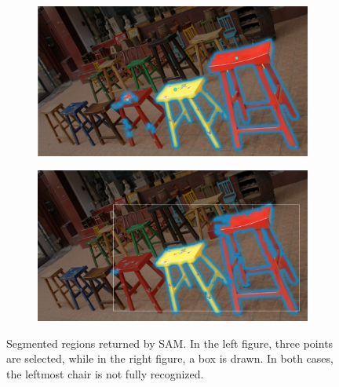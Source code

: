 \begin{figure}[H]
    \centering
    \begin{subfigure}[b]{0.48\textwidth}
        \centering
        \includegraphics[width=\textwidth]{img/sam-segmented-after-point.png}
        \label{fig:sam_point}
    \end{subfigure}
    \hfill
    \begin{subfigure}[b]{0.48\textwidth}
        \centering
        \includegraphics[width=\textwidth]{img/sam-segment-bounding-box.png}
        \label{fig:sam_box}
    \end{subfigure}
    \caption[Segmented regions returned by SAM]{Segmented regions returned by SAM. In the left figure, three points are selected, while in the right figure, a box is drawn. In both cases, the leftmost chair is not fully recognized.}
    \label{fig:sam_segments}
\end{figure}
